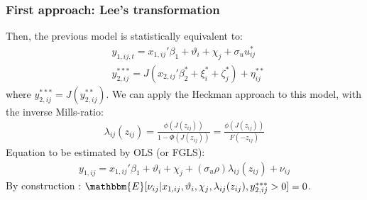 \begin{frame}
    \frametitle{First approach: Lee's transformation}
    Then, the previous model is statistically equivalent to:
    \begin{align*}
        &y_{1,ij,t} =  x_{1,ij}'\beta_1 + \vartheta_i + \chi_j + \sigma_u u_{ij}^* \\
            &y_{2,i j}^{***}= J(x_{2,ij}'{\beta_2^*}  +\xi_{i}^*+\zeta_{j}^* )+\eta^{**}_{i j}
    \end{align*}
    \noindent where $y_{2,i j}^{***}=J(y_{2,i j}^{**})$. \pause
    We can apply the Heckman approach to this model, with the inverse Mills-ratio:
    \begin{align*}
        \lambda_{ij} (z_{ij}) = \frac{\phi(J(z_{ij}))}{1 - \Phi(J(z_{ij}))} = \frac{\phi(J(z_{ij}))}{F(-z_{ij})}
      \end{align*} \pause
    Equation to be estimated by OLS (or FGLS): 
    \begin{align*}
        y_{1,ij} = x_{1,ij}'\beta_1 + \vartheta_i + \chi_j + (\sigma_u\rho) \lambda_{ij} (z_{ij}) + \nu_{ij}
    \end{align*}
    By construction : $\mathbbm{E}[\nu_{ij} \rvert x_{1,ij}, \vartheta_i, \chi_j, \lambda_{ij} (z_{ij}), y_{2,i j}^{***} > 0] = 0$.

    
\end{frame}